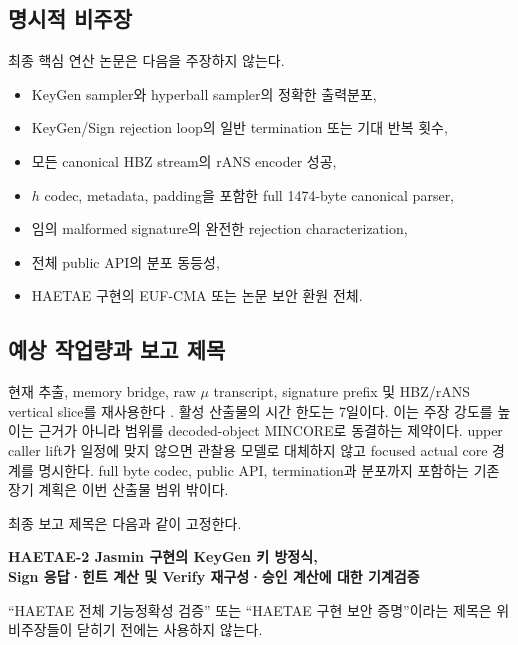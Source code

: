 \subsection{명시적 비주장}

최종 핵심 연산 논문은 다음을 주장하지 않는다.

\begin{itemize}
  \item KeyGen sampler와 hyperball sampler의 정확한 출력분포,
  \item KeyGen/Sign rejection loop의 일반 termination 또는 기대 반복 횟수,
  \item 모든 canonical HBZ stream의 rANS encoder 성공,
  \item \(h\) codec, metadata, padding을 포함한 full 1474-byte canonical
        parser,
  \item 임의 malformed signature의 완전한 rejection characterization,
  \item 전체 public API의 분포 동등성,
  \item HAETAE 구현의 EUF-CMA 또는 논문 보안 환원 전체.
\end{itemize}

\subsection{예상 작업량과 보고 제목}

현재 추출, memory bridge, raw \(\mu\) transcript, signature prefix 및
HBZ/rANS vertical slice를 재사용한다 \cite{claim-ledger,week14-report}.
활성 산출물의 시간 한도는 7일이다. 이는 주장 강도를 높이는 근거가 아니라
범위를 decoded-object MINCORE로 동결하는 제약이다. upper caller lift가 일정에
맞지 않으면 관찰용 모델로 대체하지 않고 focused actual core 경계를 명시한다.
full byte codec, public API, termination과 분포까지 포함하는 기존 장기 계획은
이번 산출물 범위 밖이다.

최종 보고 제목은 다음과 같이 고정한다.

\begin{center}
\bfseries
HAETAE-2 Jasmin 구현의 KeyGen 키 방정식,\\
Sign 응답·힌트 계산 및 Verify 재구성·승인 계산에 대한 기계검증
\end{center}

``HAETAE 전체 기능정확성 검증'' 또는 ``HAETAE 구현 보안 증명''이라는 제목은
위 비주장들이 닫히기 전에는 사용하지 않는다.
